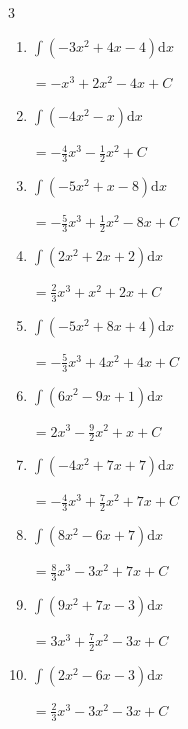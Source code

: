 \begin{multicols}{3}
\begin{enumerate}
        $\displaystyle =-\frac{2}{3}x^{3}-3x^{2}-3x+ C$

\columnbreak %

  \item $\displaystyle \int \left( -3x^{2}+4x-4 \right) \mathrm{d}x$

        $\displaystyle =-x^{3}+2x^{2}-4x+ C$

  \item $\displaystyle \int \left( -4x^{2}-x \right) \mathrm{d}x$

        $\displaystyle =-\frac{4}{3}x^{3}-\frac{1}{2}x^{2}+ C$

  \item $\displaystyle \int \left( -5x^{2}+x-8 \right) \mathrm{d}x$

        $\displaystyle =-\frac{5}{3}x^{3}+\frac{1}{2}x^{2}-8x+ C$

  \item $\displaystyle \int \left( 2x^{2}+2x+2 \right) \mathrm{d}x$

        $\displaystyle =\frac{2}{3}x^{3}+x^{2}+2x+ C$

  \item $\displaystyle \int \left( -5x^{2}+8x+4 \right) \mathrm{d}x$

        $\displaystyle =-\frac{5}{3}x^{3}+4x^{2}+4x+ C$

  \item $\displaystyle \int \left( 6x^{2}-9x+1 \right) \mathrm{d}x$

        $\displaystyle =2x^{3}-\frac{9}{2}x^{2}+x+ C$

  \item $\displaystyle \int \left( -4x^{2}+7x+7 \right) \mathrm{d}x$

        $\displaystyle =-\frac{4}{3}x^{3}+\frac{7}{2}x^{2}+7x+ C$

  \item $\displaystyle \int \left( 8x^{2}-6x+7 \right) \mathrm{d}x$

        $\displaystyle =\frac{8}{3}x^{3}-3x^{2}+7x+ C$

  \item $\displaystyle \int \left( 9x^{2}+7x-3 \right) \mathrm{d}x$

        $\displaystyle =3x^{3}+\frac{7}{2}x^{2}-3x+ C$

  \item $\displaystyle \int \left( 2x^{2}-6x-3 \right) \mathrm{d}x$

        $\displaystyle =\frac{2}{3}x^{3}-3x^{2}-3x+ C$


\end{enumerate}
\end{multicols}
